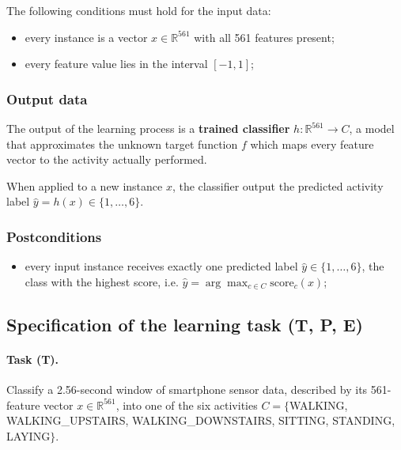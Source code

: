 \documentclass[a4paper, 11pt]{article}
\begin{document}
The following conditions must hold for the input data:
\begin{itemize}[itemsep=2pt]
  \item every instance is a vector $x \in \mathbb{R}^{561}$ with all 561 features present;
  \item every feature value lies in the interval $[-1, 1]$;
\end{itemize}

\subsubsection{Output data}

The output of the learning process is a \textbf{trained classifier} $h : \mathbb{R}^{561} \rightarrow C$, a model that approximates the unknown target function $f$ which maps every feature vector to the activity actually performed.

When applied to a new instance $x$, the classifier output the predicted activity label $\hat{y} = h(x) \in \{1,\dots,6\}$.

\subsubsection{Postconditions}

\begin{itemize}[itemsep=2pt]
  \item every input instance receives exactly one predicted label $\hat{y} \in \{1,\dots,6\}$, the class with the highest score, i.e. $\hat{y} = \arg\max_{c \in C} \mathrm{score}_c(x)$;
\end{itemize}

\subsection{Specification of the learning task (T, P, E)}
\label{sec:tpe}

\paragraph{Task (T).} Classify a 2.56-second window of smartphone sensor data, described by its 561-feature vector $x \in \mathbb{R}^{561}$, into one of the six activities $C = \{$WALKING, WALKING\_UPSTAIRS, WALKING\_DOWNSTAIRS, SITTING, STANDING, LAYING$\}$.
\end{document}
